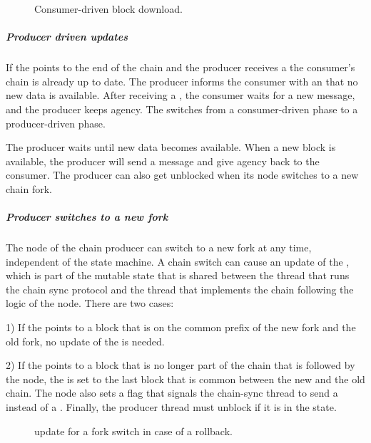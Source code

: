 \begin{figure}[ht]
\begin{center}
\end{center}
\caption{Consumer-driven block download.}
\label{read-pointer-consumer-driver}
\end{figure}

\subparagraph{Producer driven updates}
If the \readpointer{} points to the end of the chain and the producer receives
a \MsgRequestNext{}
the consumer's chain is already up to date.
The producer informs the consumer with an \MsgAwaitReply{} that no new data is available.
After receiving a \MsgAwaitReply{}, the consumer waits for a new message, and the producer keeps agency.
The \MsgAwaitReply{} switches from a consumer-driven phase to a producer-driven phase.

The producer waits until new data becomes available.
When a new block is available, the producer will
send a \MsgRollForward{} message and give agency back to the consumer.
The producer can also get unblocked when its node switches to a new chain fork.

\subparagraph{Producer switches to a new fork}
The node of the chain producer can switch to a new fork at any time, independent of the
state machine.
A chain switch can cause an update of the \readpointer{},
which is part of the mutable state that is shared between the thread that runs
the chain sync protocol and the thread that implements the chain following the logic of the node.
There are two cases:

1) If the \readpointer{} points to a block that is on the common prefix of the new
fork and the old fork, no update of the \readpointer{} is needed.

2) If the \readpointer{} points to a block that is no longer part of the chain that is followed by the node,
the \readpointer{} is set to the last block that is common between the new and the old chain.
The node also sets a flag that signals the chain-sync thread to send a \MsgRollBackward{} instead
of a \MsgRollForward.
Finally, the producer thread must unblock if it is in the \StMustReply{} state.

\begin{figure}[ht]
\begin{center}
\end{center}
\caption{\readpointer{} update for a fork switch in case of a rollback.}
\label{read-pointer-rollback}
\end{figure}

